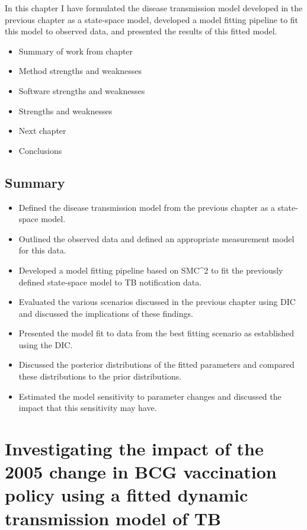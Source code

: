 \documentclass[11pt,twoside]{bristolthesis}
\providecommand{\tightlist}{%
  \setlength{\itemsep}{0pt}\setlength{\parskip}{0pt}}
\begin{document}
  In this chapter I have formulated the disease transmission model developed in the previous chapter as a state-space model, developed a model fitting pipeline to fit this model to observed data, and presented the results of this fitted model.
  \begin{itemize}
  \item
    Summary of work from chapter
  \item
    Method strengths and weaknesses
  \item
    Software strengths and weaknesses
  \item
    Strengths and weaknesses
  \item
    Next chapter
  \item
    Conclusions
  \end{itemize}
  \hypertarget{summary-8}{%
  \section{Summary}\label{summary-8}}
  \begin{itemize}
  \tightlist
  \item
    Defined the disease transmission model from the previous chapter as a state-space model.
  \item
    Outlined the observed data and defined an appropriate measurement model for this data.
  \item
    Developed a model fitting pipeline based on SMC\^{}2 to fit the previously defined state-space model to TB notification data.
  \item
    Evaluated the various scenarios discussed in the previous chapter using DIC and discussed the implications of these findings.
  \item
    Presented the model fit to data from the best fitting scenario as established using the DIC.
  \item
    Discussed the posterior distributions of the fitted parameters and compared these distributions to the prior distributions.
  \item
    Estimated the model sensitivity to parameter changes and discussed the impact that this sensitivity may have.
  \end{itemize}
  \hypertarget{model-results}{%
  \chapter{Investigating the impact of the 2005 change in BCG vaccination policy using a fitted dynamic transmission model of TB}\label{model-results}}
  
\end{document}
